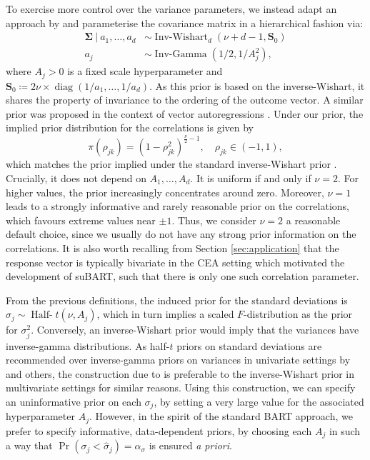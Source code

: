 \documentclass[aoas,preprint]{imsart}
\newcommand\given[1][]{\:#1\vert\:}
\theoremstyle{plain}
\theoremstyle{definition}
\theoremstyle{remark}
\begin{document}
To exercise more control over the variance parameters, we instead adapt an approach by \citet{huang2013simple} and parameterise the covariance matrix in a hierarchical fashion via:
\begin{align*}
    \boldsymbol{\Sigma} \given  a_{1},\ldots,a_{d} &\sim \operatorname{Inv-Wishart}_{d} (\nu + d - 1, \mathbf{S}_0)\\
    a_{j} &\sim \operatorname{Inv-Gamma}(1/2, 1/A^2_j),
    \end{align*}
where $A_j > 0$ is a fixed scale hyperparameter and $\mathbf{S}_0\coloneqq  2\nu \times \operatorname{diag}\left(1/a_{1}, \ldots,1/a_{d} \right)$. 
As this prior is based on the inverse-Wishart, it shares the property of invariance to the ordering of the outcome vector. A similar prior was proposed in the context of vector autoregressions \citep{giannone2015prior}. Under our prior, the implied prior distribution for the correlations is given by
\begin{equation}
    \pi\left(\rho_{jk}\right) = \left(1 - \rho_{jk}^2\right)^{\frac{\nu}{2} - 1},\quad\rho_{jk} \in \left(-1,1\right),\label{eq:implied_prior}
\end{equation}
which matches the prior implied under the standard inverse-Wishart prior \citep{barnard2000modeling}. Crucially, it does not depend on $A_1,\ldots,A_d$. It is uniform if and only if $\nu = 2$. For higher values, the prior increasingly concentrates around zero. Moreover, $\nu=1$ leads to a strongly informative and rarely reasonable prior on the correlations, which favours extreme values near $\pm 1$. Thus, we consider $\nu = 2$ a reasonable default choice, since we usually do not have any strong prior information on the correlations. It is also worth recalling from Section \ref{sec:application} that the response vector is typically bivariate in the CEA setting which motivated the development of suBART, such that there is only one such correlation parameter.

From the previous definitions, the induced prior for the standard deviations is 
$\sigma_{j} \sim \operatorname{Half-}\!t(\nu, A_{j})$,
which in turn implies a scaled $F$-distribution as the prior for $\sigma_j^2$. Conversely, an inverse-Wishart prior would imply that the variances have inverse-gamma distributions. As half-$t$ priors on standard deviations are recommended over inverse-gamma priors on variances in univariate settings by \citet{gelman2006prior} and others, the construction due to \citet{huang2013simple} is preferable to the inverse-Wishart prior in multivariate settings for similar reasons. Using this construction, we can specify an uninformative prior on each $\sigma_{j}$, by setting a very large value for the associated hyperparameter $A_j$. However, in the spirit of the standard BART approach, we prefer to specify informative, data-dependent priors, by choosing each $A_j$ in such a way that $\Pr(\sigma_j < \hat{\sigma}_j)=\alpha_\sigma$ is ensured \textit{a priori}.
\end{document}
